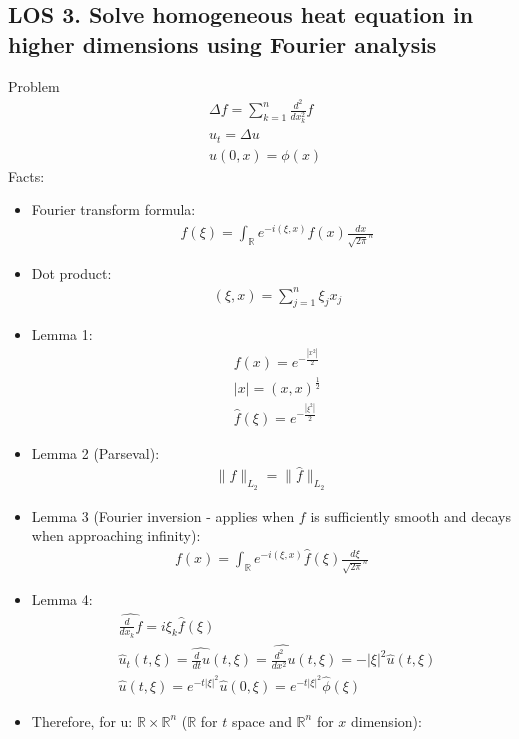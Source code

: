 \documentclass[12pt, a4paper]{article}
\begin{document}
\subsection*{LOS 3. Solve homogeneous heat equation in higher dimensions using Fourier analysis}
Problem
\begin{align*}
    &\Delta f = \sum_{k=1}^n\frac{d^2}{dx_k^2}f\\
    &u_t= \Delta u\\
    &u(0, x) = \phi(x)
\end{align*}
Facts:
\begin{itemize}
    \item Fourier transform formula:
    \begin{align*}
        &\hat{f}(\xi) = \int_{\mathbb{R}}e^{-i(\xi, x)}f(x)\frac{dx}{\sqrt{2\pi}^n}
    \end{align*}
    \item Dot product:
    \begin{align*}
        &(\xi, x) = \sum_{j=1}^n\xi_jx_j
    \end{align*}
    \item Lemma 1:
    \begin{align*}
        &f(x) = e^{-\frac{|x^2|}{2}}\\
        &|x| = (x, x)^{\frac{1}{2}}\\
        &\hat{f}(\xi) = e^{-\frac{|\xi^2|}{2}}
    \end{align*}
    \item Lemma 2 (Parseval):
    \begin{align*}
        \|f\|_{L_2}=\|\hat{f}\|_{L_2}
    \end{align*}
    \item Lemma 3 (Fourier inversion - applies when $f$ is sufficiently smooth and decays when approaching infinity):
    \begin{align*}
        f(x) = \int_{\mathbb{R}}e^{-i(\xi, x)}\hat{f}(\xi)\frac{d\xi}{\sqrt{2\pi}^n}
    \end{align*}
    \item Lemma 4:
    \begin{align*}
        &\widehat{\frac{d}{dx_k}f} = i\xi_k\hat{f}(\xi)\\
        &\hat{u}_t(t, \xi) = \widehat{\frac{d}{dt}u}(t, \xi) = \widehat{\frac{d^2}{dx^2}u}(t, \xi) = -|\xi|^2\hat{u}(t,\xi)\\
        &\hat{u}(t, \xi) = e^{-t|\xi|^2}\hat{u}(0, \xi) = e^{-t|\xi|^2}\hat{\phi}(\xi)
    \end{align*}
    \item Therefore, for u: $\mathbb{R}\times\mathbb{R}^n$ ($\mathbb{R}$ for $t$ space and $\mathbb{R}^n$ for $x$ dimension):

\end{itemize}
\end{document}
